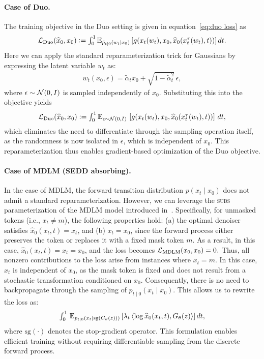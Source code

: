 \paragraph{Case of Duo.} The training objective in the Duo setting is given in equation~\eqref{eq:duo loss} as
\begin{gather}
  \textstyle \mathcal{L}_{\text{Duo}}(\widehat{x}_0, x_0)\vcentcolon=
  \int_0^1 \mathbb{E}_{\tilde{p}_{t\mid 0}(w_t\mid x_0)} \left[g(x_t(w_t),x_0, \widehat{x}_0(x_t^{\tau}(w_t), t))\right]dt. \nonumber
\end{gather}
Here we can apply the standard reparameterization trick for Gaussians by expressing the latent variable $w_t$ as:
\begin{gather}
  \textstyle w_t(x_0, \epsilon) = \tilde{\alpha}_t x_0 + \sqrt{1 - \tilde{\alpha}_t^2} \, \epsilon,
\end{gather}
where $\epsilon \sim \mathcal{N}(0, I)$ is sampled independently of $x_0$. Substituting this into the objective yields
\begin{gather}
  \textstyle \mathcal{L}_{\text{Duo}}(\widehat{x}_0, x_0)\vcentcolon=
  \int_0^1 \mathbb{E}_{\epsilon \sim \mathcal{N}(0, I)} \, \left[g(x_t(w_t),x_0, \widehat{x}_0(x_t^{\tau}(w_t), t))\right] \, dt,
\end{gather}
which eliminates the need to differentiate through the sampling operation itself, as the randomness is now isolated in $\epsilon$, which is independent of $x_0$. This reparameterization thus enables gradient-based optimization of the Duo objective.

\paragraph{Case of MDLM (SEDD absorbing).} In the case of MDLM, the forward transition distribution $p(x_t \mid x_0)$ does not admit a standard reparameterization. However, we can leverage the \textsc{subs} parameterization of the MDLM model introduced in~\citep[see Section 3.2.3]{sahoo2024simple}. Specifically, for unmasked tokens (i.e., $x_t \neq m$), the following properties hold: (a) the optimal denoiser satisfies $\widehat{x}_0(x_t, t) = x_t$, and (b) $x_t = x_0$, since the forward process either preserves the token or replaces it with a fixed mask token $m$. As a result, in this case, $\widehat{x}_0(x_t, t) = x_t = x_0$, and the loss becomes $\mathcal{L}_{\text{MDLM}}(x_0, x_0) = 0.$
Thus, all nonzero contributions to the loss arise from instances where $x_t = m$. In this case, $x_t$ is independent of $x_0$, as the mask token is fixed and does not result from a stochastic transformation conditioned on $x_0$. Consequently, there is no need to backpropagate through the sampling of $p_{t \mid 0}(x_t \mid x_0)$. This allows us to rewrite the loss as:
\begin{gather}
  \textstyle \int_0^1 \, \mathbb{E}_{p_{t \mid 0}(x_t \mid \text{sg}(G_{\theta}(z)))} \left[
  \lambda_t \, \langle \log \widehat{x}_0(x_t, t), G_{\theta}(z) \rangle
  \right] dt,
  \nonumber
\end{gather}
where $\text{sg}(\cdot)$ denotes the stop-gradient operator. This formulation enables efficient training without requiring differentiable sampling from the discrete forward process.

